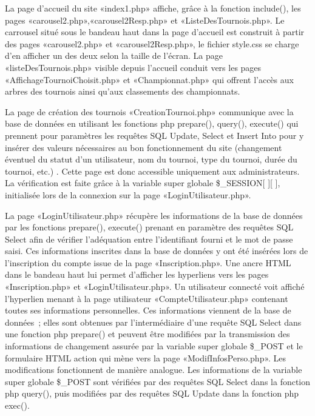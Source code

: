 \documentclass[12pt]{report}
\begin{document}
       \par
	   La page d’accueil du site «index1.php» affiche, grâce à la fonction include(), les pages «carousel2.php»,«carousel2Resp.php» et «ListeDesTournois.php».
       Le carrousel situé sous le bandeau haut dans la page d’accueil est construit à partir des pages «carousel2.php» et «carousel2Resp.php», le fichier style.css se charge d’en afficher un des deux selon la taille de l’écran.
       La page «listeDesTournois.php» visible depuis l’accueil conduit vers les pages «AffichageTournoiChoisit.php» et «Championnat.php» qui offrent l’accès aux arbres des tournois ainsi qu’aux classements des championnats.
       \bigskip
       \par       
       La page de création des tournois «CreationTournoi.php» communique avec la base de données en utilisant les fonctions php prepare(), query(), execute() qui prennent pour paramètres  les requêtes SQL Update, Select et Insert Into pour y insérer des valeurs nécessaires au bon fonctionnement du site (changement éventuel du statut d’un utilisateur, nom du tournoi, type du tournoi, durée du tournoi, etc.) . Cette page est donc accessible uniquement aux administrateurs. La vérification est faite grâce à la variable super globale \$\_SESSION[ ][ ], initialisée lors de la connexion sur la page «LoginUtilisateur.php».
       \bigskip
       \par
 	   La page «LoginUtilisateur.php» récupère les informations de la base de 
 	   données par les fonctions prepare(), execute() prenant en paramètre des 
 	   requêtes SQL Select afin de vérifier l’adéquation entre l’identifiant 
 	   fourni et le mot de passe saisi. Ces informations inscrites dans la base 
 	   de données  y ont été insérées lors de l’inscription du compte issue de 
 	   la page «Inscription.php». Une ancre HTML dans le bandeau haut lui 
 	   permet d’afficher les hyperliens vers les pages «Inscription.php» et 
 	   «LoginUtilisateur.php».
       Un utilisateur connecté voit affiché l’hyperlien menant à la page utilisateur  «CompteUtilisateur.php» contenant toutes ses informations personnelles. Ces informations viennent de la base de données ; elles sont obtenues par l’intermédiaire d’une requête SQL Select dans une fonction php prepare() et peuvent être modifiées par la transmission des informations de changement assurée par la variable super globale \$\_POST et le formulaire HTML action qui mène vers la page «ModifInfosPerso.php». Les modifications fonctionnent de manière analogue. Les informations de la variable super globale \$\_POST sont vérifiées par des requêtes SQL Select dans la fonction php query(), puis modifiées par des requêtes SQL Update dans la fonction php exec().
\end{document}
